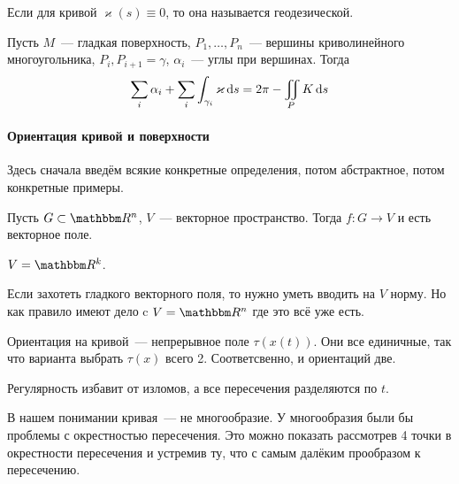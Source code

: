 \documentclass[draft,timbord]{longnotes}
\begin{document}
\begin{defn}\label{defn:dg::bonnet::geodcurv}
  Если для кривой $\varkappa(s) \equiv 0$, то она называется геодезической.
\end{defn}

\begin{thrm}\label{thrm:dg::bonnet}
  Пусть $M$~--- гладкая поверхность, $P_1, \dotsc, P_n$~--- вершины криволинейного многоугольника,
  $P_i, P_{i+1} = \gamma $, $\alpha_i$~--- углы при вершинах. Тогда \[
    \sum_i \alpha_i + \sum_i \int _{\gamma_i} \varkappa \, \mathrm{d} s  = 2 \pi - \iint_P K \, \mathrm{d} s
  \]
\end{thrm}





\paragraph{Ориентация кривой и поверхности}
\label{par:dg::orient}

Здесь сначала введём всякие конкретные определения, потом абстрактное, потом конкретные примеры.

\begin{defn}\label{defn:dg::orient::vecf}
  Пусть $G \subset \R^n$, $V$~--- векторное пространство. Тогда $f \colon G \to V$ и есть векторное 
  поле.
\end{defn}
\begin{exmp}\label{exmp:dg::orient::vecf}
  $V = \R^k$.
\end{exmp}

\begin{rem}\label{rem:dg::orient::vecf} 
  Если захотеть гладкого векторного поля,
  то нужно уметь вводить на $V$ норму.  Но как правило имеют
  дело c $V = \R^n$ где это всё уже есть.
\end{rem}

\begin{defn}\label{defn:dg::orient::curve}
  Ориентация на кривой~--- непрерывное поле $\tau(x(t))$. Они все единичные, так что варианта
  выбрать $\tau(x)$ всего 2. Соответсвенно, и ориентаций две.
\end{defn}
\begin{rem}\label{rem:dg::orient::curvecor}
  Регулярность избавит от изломов, а все пересечения разделяются по $t$.
\end{rem}

\begin{rem}[\flame]\label{rem:dg::orient::curverman}
  В нашем понимании кривая~--- не многообразие. У многообразия были бы проблемы с окрестностью
  пересечения. Это можно показать рассмотрев 4 точки в окрестности пересечения и устремив ту, что
  с самым далёким прообразом к пересечению.
\end{rem}
\end{document}
